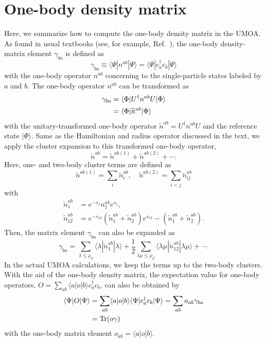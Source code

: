 \documentclass[aps,prc, dvips, twocolumn,groupedaddress,showkeys,showpacs,floatfix,superscriptaddress]{revtex4-1}
\newcommand{\<}{\langle}
\renewcommand{\>}{\rangle}
\begin{document}
\section{One-body density matrix\label{Sec:density}}
Here, we summarize how to compute the one-body density matrix in the UMOA.
As found in usual textbooks (see, for example, Ref.~\cite{Ring:2004}),
the one-body density-matrix element
 $\gamma_{ba}$ is defined as
\begin{equation}
\label{density_1}
\gamma_{ba} \equiv  \<\Psi|n^{ab}|\Psi\>  = \<\Psi|c^{\dag}_{a}c_{b}|\Psi\>
\end{equation}
with the one-body operator $n^{ab}$ concerning to the single-particle states labeled by $a$ and $b$.
The one-body operator $n^{ab}$ can be transformed as
\begin{align}
  \gamma_{ba} &= \<\Phi|U^{\dag} n^{ab}U|\Phi\> \notag \\
  & = \<\Phi|\widetilde{n}^{ab}|\Phi\>
\end{align}
with the unitary-transformed one-body operator $\widetilde{n}^{ab} = U^{\dag}n^{ab}U$ and the reference state $|\Phi\>$.
Same as the Hamiltonian and radius operator discussed in the text, we apply the cluster expansion to this transformed one-body operator,
\begin{equation}
  \widetilde{n}^{ab} = \widetilde{n}^{ab(1)} + \widetilde{n}^{ab(2)} + \cdots.
\end{equation}
Here, one- and two-body cluster terms are defined as
\begin{equation}
  \widetilde{n}^{ab(1)} = \sum_{i} \widetilde{n}^{ab}_{i}, \quad
  \widetilde{n}^{ab(2)} = \sum_{i<j} \widetilde{n}^{ab}_{ij}
\end{equation}
with
\begin{align}
  \widetilde{n}^{ab}_{1} &= e^{-s_{1}} n^{ab}_{1} e^{s_{1}}, \\
  \widetilde{n}^{ab}_{12} &= e^{-s_{12}}(\widetilde{n}^{ab}_{1} + \widetilde{n}^{ab}_{2}) e^{s_{12}}
   - (\widetilde{n}^{ab}_{1} + \widetilde{n}^{ab}_{2}).
\end{align}
Then, the matrix element $\gamma_{ba}$ can also be expanded as
\begin{equation}
\gamma_{ba} = \sum_{\lambda \le \rho_{F}} \<\lambda|\widetilde{n}^{ab}_{1}|\lambda\> +
\frac{1}{2} \sum_{\lambda \mu \le \rho_{F}} \<\lambda\mu|\widetilde{n}^{ab}_{12} |\lambda\mu\>
 + \cdots.
\end{equation}
In the actual UMOA calculations, we keep the terms up to the two-body clusters.
With the aid of the one-body density matrix, the expectation value for one-body operators,
 $O = \sum_{ab}\<a|o|b\> c^{\dag}_{a}c_{b}$, can also be obtained by
 \begin{align}
   \<\Psi|O|\Psi\> &=   \sum_{ab}\<a|o|b\>\<\Psi|c^{\dag}_{a}c_{b}|\Psi\> = \sum_{ab}o_{ab}\gamma_{ba} \notag \\
   \label{tr-exp}
   & = {\rm Tr}(o\gamma)
 \end{align}
with the one-body matrix element $o_{ab} = \<a|o|b\>$.
\end{document}
